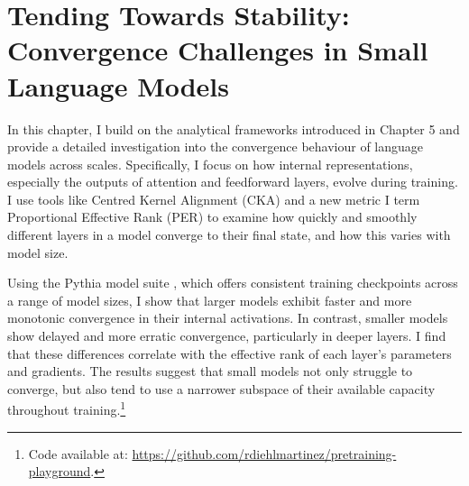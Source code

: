 \chapter{Tending Towards Stability: Convergence Challenges in Small Language Models}
\label{chapter:tending-towards-stability}



In this chapter, I build on the analytical frameworks introduced in Chapter 5 and provide a detailed investigation into the convergence behaviour of language models across scales. Specifically, I focus on how internal representations, especially the outputs of attention and feedforward layers, evolve during training. I use tools like Centred Kernel Alignment (CKA) and a new metric I term Proportional Effective Rank (PER) to examine how quickly and smoothly different layers in a model converge to their final state, and how this varies with model size.

Using the Pythia model suite \citep{biderman2023pythia}, which offers consistent training checkpoints across a range of model sizes, I show that larger models exhibit faster and more monotonic convergence in their internal activations. In contrast, smaller models show delayed and more erratic convergence, particularly in deeper layers. I find that these differences correlate with the effective rank of each layer's parameters and gradients. The results suggest that small models not only struggle to converge, but also tend to use a narrower subspace of their available capacity throughout training.\footnote{Code available at: \url{https://github.com/rdiehlmartinez/pretraining-playground}.}

